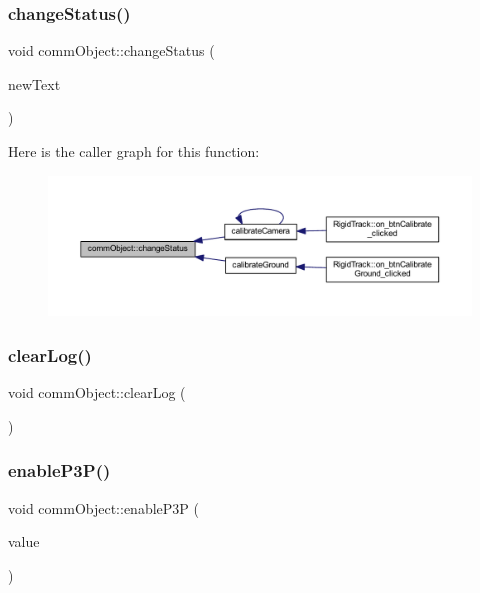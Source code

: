 \subsubsection{\texorpdfstring{change\+Status()}{changeStatus()}}
{\footnotesize\ttfamily void comm\+Object\+::change\+Status (\begin{DoxyParamCaption}\item[{Q\+String}]{new\+Text }\end{DoxyParamCaption})}

Here is the caller graph for this function\+:
\nopagebreak
\begin{figure}[H]
\begin{center}
\leavevmode
\includegraphics[width=350pt]{classcomm_object_a1f4b8dd22ecc46bab619f6b1fe1a5144_icgraph}
\end{center}
\end{figure}
\mbox{\label{classcomm_object_a785f776d16f1871786bb88482fc4dd1f}} 
\subsubsection{\texorpdfstring{clear\+Log()}{clearLog()}}
{\footnotesize\ttfamily void comm\+Object\+::clear\+Log (\begin{DoxyParamCaption}{ }\end{DoxyParamCaption})}

\mbox{\label{classcomm_object_a7552116eb5e18c49c6dcf943de29af7a}} 
\subsubsection{\texorpdfstring{enable\+P3\+P()}{enableP3P()}}
{\footnotesize\ttfamily void comm\+Object\+::enable\+P3P (\begin{DoxyParamCaption}\item[{bool}]{value }\end{DoxyParamCaption})}

